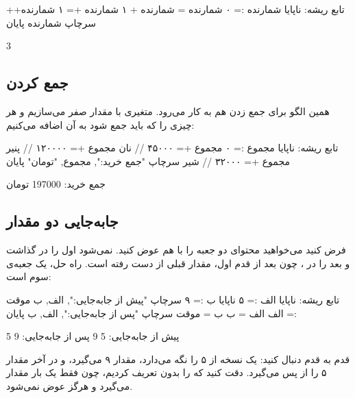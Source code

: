 \begin{salamfa}
تابع ریشه:
    ناپایا شمارنده := ۰
    شمارنده = شمارنده + ۱
    شمارنده += ۱
    شمارنده++
    سرچاپ شمارنده
پایان
\end{salamfa}

\begin{outputfa}
3
\end{outputfa}

\subsection{جمع کردن}

همین الگو برای جمع زدن هم به کار می‌رود. متغیری با مقدار صفر می‌سازیم و هر
چیزی را که باید جمع شود به آن اضافه می‌کنیم:

\begin{salamfa}
تابع ریشه:
    ناپایا مجموع := ۰
    مجموع += ۴۵۰۰۰    // نان
    مجموع += ۱۲۰۰۰۰   // پنیر
    مجموع += ۳۲۰۰۰    // شیر
    سرچاپ "جمع خرید:", مجموع, "تومان"
پایان
\end{salamfa}

\begin{outputfa}
جمع خرید: 197000 تومان
\end{outputfa}

\subsection{جابه‌جایی دو مقدار}

فرض کنید می‌خواهید محتوای دو جعبه را با هم عوض کنید. نمی‌شود اول 
را در  گذاشت و بعد  را در ، چون بعد از قدم
اول، مقدار قبلی  از دست رفته است. راه حل، یک جعبه‌ی سوم است:

\begin{salamfa}
تابع ریشه:
    ناپایا الف := ۵
    ناپایا ب := ۹
    سرچاپ "پیش از جابه‌جایی:", الف, ب
    موقت := الف
    الف = ب
    ب = موقت
    سرچاپ "پس از جابه‌جایی:", الف, ب
پایان
\end{salamfa}

\begin{outputfa}
پیش از جابه‌جایی: 5 9
پس از جابه‌جایی: 9 5
\end{outputfa}

قدم به قدم دنبال کنید:  یک نسخه از ۵ را نگه می‌دارد، 
مقدار ۹ می‌گیرد، و در آخر  مقدار ۵ را از  پس می‌گیرد.
دقت کنید که  را بدون  تعریف کردیم، چون فقط یک بار
مقدار می‌گیرد و هرگز عوض نمی‌شود.

